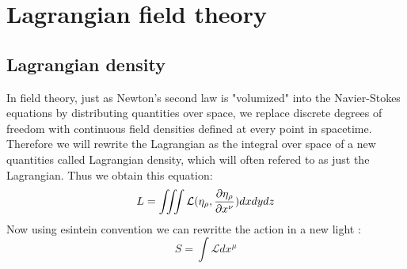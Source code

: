 \documentclass{article}
\begin{document}
\section{Lagrangian field theory}
\subsection{Lagrangian density}
In field theory, just as Newton's second law is "volumized" into the Navier-Stokes equations by distributing quantities over space, 
we replace discrete degrees of freedom with continuous field densities defined at every point in spacetime.
Therefore we will rewrite the Lagrangian as the integral over space of a new quantities called Lagrangian density, which will often refered to as just the Lagrangian.
Thus we obtain this equation:
\begin{equation} \label{densitylagrandef}
    L = \iiint \mathcal{L}(\eta_{\rho},\pdv{\eta_{\rho}}{x^{\nu}}) dx dy dz
\end{equation}
Now using esintein convention we can rewritte the action in a new light :
\begin{equation} \label{actiondensitylag}
    S = \int \mathcal{L} dx^\mu
\end{equation}
\end{document}
